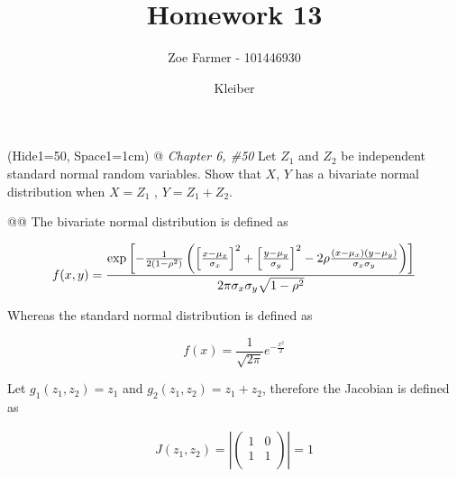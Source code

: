 \documentclass[11pt]{article}\usepackage[]{graphicx}\usepackage[]{xcolor}
\title{Homework 13}
\date{Kleiber}
\author{Zoe Farmer - 101446930}
\begin{document}
\maketitle

\begin{table}[H]
    \centering
\end{table}

\begin{easylist}[enumerate]
    \ListProperties(Hide1=50, Space1=1cm)
    @ \textit{Chapter 6, \#50} Let $Z_1$ and $Z_2$ be independent standard normal random variables. Show that $X$, $Y$
    has a bivariate normal distribution when $X = Z_1$ , $Y = Z_1 + Z_2$.

    @@ The bivariate normal distribution is defined as

    \begin{equation}
        f(x, y) =
            \frac{%
            \exp \left[
                - \frac{1}{2\left( 1 - \rho^2 \right)}
                \left(
                    {\left[ \frac{x - \mu_x}{\sigma_x} \right]}^2 +
                    {\left[ \frac{y - \mu_y}{\sigma_y} \right]}^2 -
                    2 \rho \frac{(x - \mu_x)(y - \mu_y)}{\sigma_x\sigma_y}
                \right)
            \right]}{2\pi \sigma_x \sigma_y \sqrt{1 - \rho^2} }
    \end{equation}

    Whereas the standard normal distribution is defined as

    \begin{equation}
        f(x) = \frac{1}{\sqrt{2\pi} } e^{ -\frac{x^2}{2} }
    \end{equation}

    Let $g_1(z_1, z_2) = z_1$ and $g_2(z_1, z_2) = z_1 + z_2$, therefore the Jacobian is defined as

    \begin{equation}
        \begin{aligned}
            J(z_1, z_2) = \left| \begin{pmatrix}
                                     1 & 0\\
                                     1 & 1\\
                                 \end{pmatrix}
                          \right| = 1
        \end{aligned}
    \end{equation}


\end{easylist}
\end{document}
